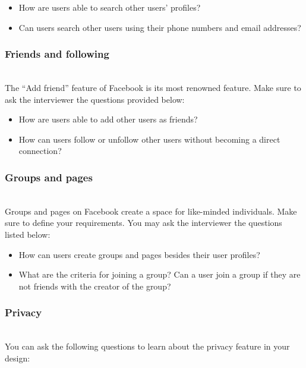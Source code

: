 \begin{itemize}
\item
\protect{}\label{qtrqwBpLByXHhU4AoCMAK}
How are users able to search other users' profiles?
\item
\protect{}\label{b--EwcroBVhKwmtfrs3N3}
Can users search other users using their phone numbers and email addresses?
\end{itemize}

\subsubsection{Friends and following}\label{VGR7ClzwPPl64nVfMA23v}
\\
The ``Add friend'' feature of Facebook is its most renowned feature. Make sure to ask the interviewer the questions provided below:

\begin{itemize}
\item
\protect{}\label{bKOJKgzsVt3Eo580sdZtL}
How are users able to add other users as friends?
\item
\protect{}\label{FcYedL5AtyaasR9gKUeiF}
How can users follow or unfollow other users without becoming a direct connection?
\end{itemize}

\subsubsection{Groups and pages}\label{O_yAGdn6DNBBzLuecZp-s}
\\
Groups and pages on Facebook create a space for like-minded individuals. Make sure to define your requirements. You may ask the interviewer the questions listed below:

\begin{itemize}
\item
\protect{}\label{G8oYUK08G_HtZqggOCbwu}
How can users create groups and pages besides their user profiles?
\item
\protect{}\label{euqbLSYNTPVBCprgztjyZ}
What are the criteria for joining a group? Can a user join a group if they are not friends with the creator of the group?
\end{itemize}

\subsubsection{Privacy}\label{o3TTODJfFMDBeNqrQlqV4}
\\
You can ask the following questions to learn about the privacy feature in your design:


